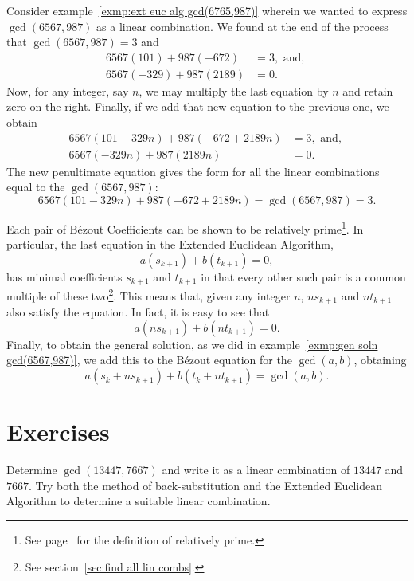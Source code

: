 \begin{exmp}\label{exmp:gen soln gcd(6567,987)}
 Consider example~\ref{exmp:ext euc alg gcd(6765,987)} wherein we wanted to express
 $\gcd(6567,987)$ as a linear combination. We found at the end of the process
 that $\gcd(6567,987)=3$ and
 \begin{align*}
   6567(101)+987(-672)    &= 3,\text{ and, }\\
   6567(-329) + 987(2189) &= 0.
 \end{align*}
 Now, for any integer, say $n$, we may multiply the last equation by $n$ and retain
 zero on the right. Finally, if we add that new equation to the previous one, we
 obtain
 \begin{align*}
   6567(101-329n)+987(-672+2189n)    &= 3,\text{ and, }\\
     6567(-329n) + 987(2189n) &= 0.
 \end{align*}
 The new penultimate equation gives the form for all the linear combinations
 equal to the $\gcd(6567,987)$:
 \[
  6567(101-329n)+987(-672+2189n)  =\gcd(6567,987)=3.
 \]
\end{exmp}

Each pair of B\'ezout Coefficients can be shown to be relatively prime\footnote{See page~\pageref{def:rel prime} for the definition of relatively prime.}.
In particular, the last equation in the Extended Euclidean Algorithm,
\[
 a(s_{k+1}) + b(t_{k+1}) = 0,
\]
has minimal coefficients $s_{k+1}$ and $t_{k+1}$ in that every other such pair
is a common multiple of these two\footnote{See section~\ref{sec:find all lin combs}.}.
This means that, given any integer $n$, $ns_{k+1}$ and $nt_{k+1}$ also satisfy the
equation. In fact, it is easy to see that
\[
 a(ns_{k+1}) + b(nt_{k+1}) =0.
\]
Finally, to obtain the general solution, as we did in example~\ref{exmp:gen soln gcd(6567,987)}, we add this to the B\'ezout equation for the $\gcd(a,b)$,
obtaining
\[
 a(s_k+ns_{k+1}) + b(t_k +nt_{k+1}) = \gcd(a,b).
\]

\clearpage
\section{Exercises}

\begin{exer}
Determine $\gcd(13447,7667)$ and write it as a linear combination of $13447$ and $7667$.
Try both the method of back-substitution and the Extended Euclidean Algorithm
 to determine a suitable linear combination.
\end{exer}

